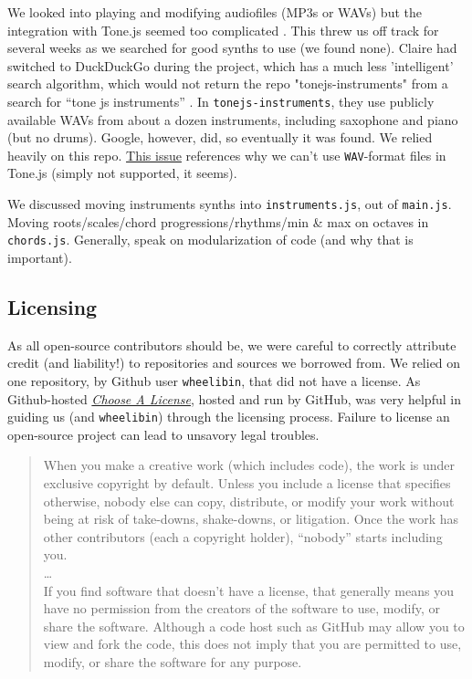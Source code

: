 \documentclass[12pt,a4paper]{article}
\newcommand{\code}{\texttt}
\newcommand{\lightcode}[1]{\colorbox{light-gray}{\texttt{#1}}}
\begin{document}
We looked into playing and modifying audiofiles (MP3s or WAVs) but the integration with Tone.js seemed too complicated \cite{tonejs-issue}. This threw us off track for several weeks as we searched for good synths to use (we found none). Claire had switched to DuckDuckGo during the project, which has a much less 'intelligent' search algorithm, which would not return the repo "tonejs-instruments" from a search for ``tone js instruments'' \cite{tonejs-instruments}. In \lightcode{tonejs-instruments}, they use publicly available WAVs from about a dozen instruments, including saxophone and piano (but no drums). Google, however, did, so eventually it was found. We relied heavily on this repo. \href{https://github.com/Tonejs/Tone.js/issues/290}{This issue} references why we can't use \code{WAV}-format files in Tone.js (simply not supported, it seems). 

We discussed moving instruments synths into \lightcode{instruments.js}, out of \lightcode{main.js}. Moving roots/scales/chord progressions/rhythms/min \& max on octaves in \lightcode{chords.js}. Generally, speak on modularization of code (and why that is important).

\subsection{Licensing}

As all open-source contributors should be, we were careful to correctly attribute credit (and liability!) to repositories and sources we borrowed from. We relied on one repository, by Github user \code{wheelibin}, that did not have a license. As Github-hosted \href{https://choosealicense.com/}{\textit{Choose A License}}, hosted and run by GitHub, was very helpful in guiding us (and \code{wheelibin}) through the licensing process. Failure to license an open-source project can lead to unsavory legal troubles. 

\begin{quote}
When you make a creative work (which includes code), the work is under exclusive copyright by default. Unless you include a license that specifies otherwise, nobody else can copy, distribute, or modify your work without being at risk of take-downs, shake-downs, or litigation. Once the work has other contributors (each a copyright holder), “nobody” starts including you. \\
\dots \\
If you find software that doesn’t have a license, that generally means you have no permission from the creators of the software to use, modify, or share the software. Although a code host such as GitHub may allow you to view and fork the code, this does not imply that you are permitted to use, modify, or share the software for any purpose. \cite{choose-license-none}
\end{quote}
\end{document}
